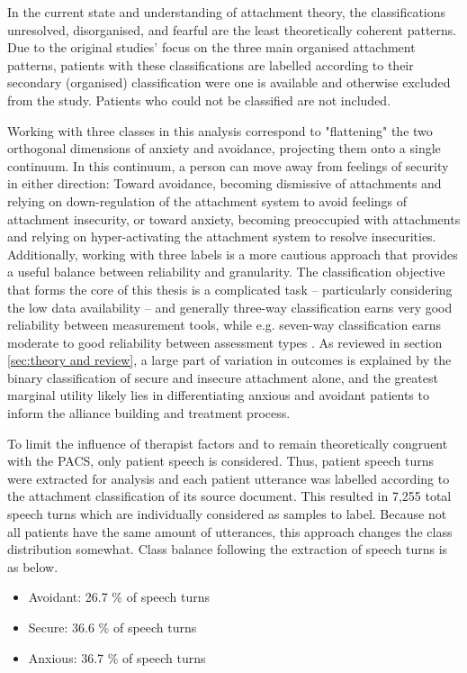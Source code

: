 \documentclass[12pt]{report}
\begin{document}
In the current state and understanding of attachment theory, the classifications unresolved, disorganised, and fearful are the least theoretically coherent patterns.
Due to the original studies' focus on the three main organised attachment patterns, patients with these classifications are labelled according to their secondary (organised) classification were one is available and otherwise excluded from the study.
Patients who could not be classified are not included.

Working with three classes in this analysis correspond to "flattening" the two orthogonal dimensions of anxiety and avoidance, projecting them onto a single continuum.
In this continuum, a person can move away from feelings of security in either direction: Toward avoidance, becoming dismissive of attachments and relying on down-regulation of the attachment system to avoid feelings of attachment insecurity, or toward anxiety, becoming preoccupied with attachments and relying on hyper-activating the attachment system to resolve insecurities.
Additionally, working with three labels is a more cautious approach that provides a useful balance between reliability and granularity.
The classification objective that forms the core of this thesis is a complicated task -- particularly considering the low data availability -- and generally three-way classification earns very good reliability between measurement tools, while e.g. seven-way classification earns moderate to good reliability between assessment types \cite{Talia2020, Talia2014}.
As reviewed in section \ref{sec:theory and review}, a large part of variation in outcomes is explained by the binary classification of secure and insecure attachment alone, and the greatest marginal utility likely lies in differentiating anxious and avoidant patients to inform the alliance building and treatment process.

To limit the influence of therapist factors and to remain theoretically congruent with the PACS, only patient speech is considered.
Thus, patient speech turns were extracted for analysis and each patient utterance was labelled according to the attachment classification of its source document.
This resulted in 7,255 total speech turns which are individually considered as samples to label.
Because not all patients have the same amount of utterances, this approach changes the class distribution somewhat.
Class balance following the extraction of speech turns is as below.
\begin{itemize}
    \item {Avoidant: 26.7 \% of speech turns}
    \item {Secure: 36.6 \% of speech turns}
    \item {Anxious: 36.7 \% of speech turns}
\end{itemize}
\end{document}
